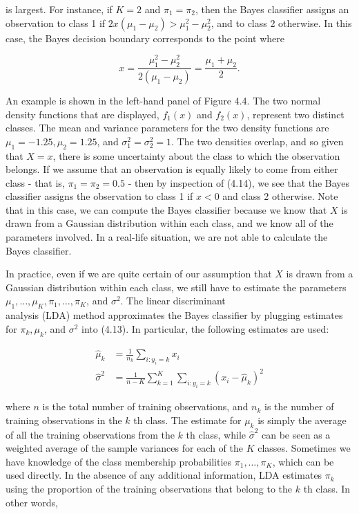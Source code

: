 \documentclass[10pt]{article}
\begin{document}
is largest. For instance, if $K=2$ and $\pi_{1}=\pi_{2}$, then the Bayes classifier assigns an observation to class 1 if $2 x\left(\mu_{1}-\mu_{2}\right)>\mu_{1}^{2}-\mu_{2}^{2}$, and to class 2 otherwise. In this case, the Bayes decision boundary corresponds to the point where


\begin{equation*}
x=\frac{\mu_{1}^{2}-\mu_{2}^{2}}{2\left(\mu_{1}-\mu_{2}\right)}=\frac{\mu_{1}+\mu_{2}}{2} . \tag{4.14}
\end{equation*}


An example is shown in the left-hand panel of Figure 4.4. The two normal density functions that are displayed, $f_{1}(x)$ and $f_{2}(x)$, represent two distinct classes. The mean and variance parameters for the two density functions are $\mu_{1}=-1.25, \mu_{2}=1.25$, and $\sigma_{1}^{2}=\sigma_{2}^{2}=1$. The two densities overlap, and so given that $X=x$, there is some uncertainty about the class to which the observation belongs. If we assume that an observation is equally likely to come from either class - that is, $\pi_{1}=\pi_{2}=0.5$ - then by inspection of (4.14), we see that the Bayes classifier assigns the observation to class 1 if $x<0$ and class 2 otherwise. Note that in this case, we can compute the Bayes classifier because we know that $X$ is drawn from a Gaussian distribution within each class, and we know all of the parameters involved. In a real-life situation, we are not able to calculate the Bayes classifier.

In practice, even if we are quite certain of our assumption that $X$ is drawn from a Gaussian distribution within each class, we still have to estimate the parameters $\mu_{1}, \ldots, \mu_{K}, \pi_{1}, \ldots, \pi_{K}$, and $\sigma^{2}$. The linear discriminant\\
analysis (LDA) method approximates the Bayes classifier by plugging estimates for $\pi_{k}, \mu_{k}$, and $\sigma^{2}$ into (4.13). In particular, the following estimates are used:


\begin{align*}
\hat{\mu}_{k} & =\frac{1}{n_{k}} \sum_{i: y_{i}=k} x_{i} \\
\hat{\sigma}^{2} & =\frac{1}{n-K} \sum_{k=1}^{K} \sum_{i: y_{i}=k}\left(x_{i}-\hat{\mu}_{k}\right)^{2} \tag{4.15}
\end{align*}


where $n$ is the total number of training observations, and $n_{k}$ is the number of training observations in the $k$ th class. The estimate for $\mu_{k}$ is simply the average of all the training observations from the $k$ th class, while $\hat{\sigma}^{2}$ can be seen as a weighted average of the sample variances for each of the $K$ classes. Sometimes we have knowledge of the class membership probabilities $\pi_{1}, \ldots, \pi_{K}$, which can be used directly. In the absence of any additional information, LDA estimates $\pi_{k}$ using the proportion of the training observations that belong to the $k$ th class. In other words,
\end{document}

